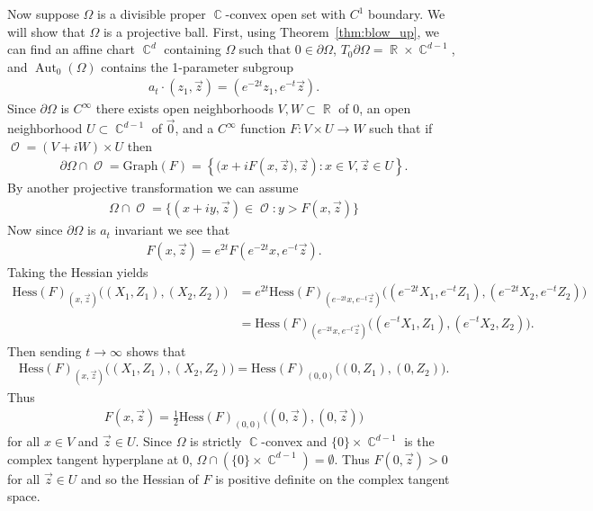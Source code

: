 \documentclass[12pt]{amsart}
\theoremstyle{plain}
\theoremstyle{definition}
\theoremstyle{remark}
\begin{document}
Now suppose $\Omega$ is a divisible proper $\operatorname{\mathbb{C}}$-convex open set with $C^1$ boundary. We will show that $\Omega$ is a projective ball. First, using Theorem~\ref{thm:blow_up}, we can find an affine chart $\operatorname{\mathbb{C}}^d$ containing $\Omega$ such that  $0 \in \partial \Omega$, $T_0 \partial \Omega = \operatorname{\mathbb{R}} \times \operatorname{\mathbb{C}}^{d-1}$, and $\operatorname{Aut}_0(\Omega)$ contains the 1-parameter subgroup
\begin{align*}
a_t \cdot (z_1, \vec{z}) = ( e^{-2t} z_1, e^{-t} \vec{z}).
\end{align*}
Since $\partial \Omega$ is $C^\infty$ there exists open neighborhoods $V,W \subset \operatorname{\mathbb{R}}$ of $0$, an open neighborhood $U \subset \operatorname{\mathbb{C}}^{d-1}$ of $\vec{0}$, and a $C^\infty$ function $F:V \times U \rightarrow W$ such that if $\operatorname{\mathcal{O}} = (V+iW) \times U$ then 
\begin{align*}
\partial \Omega \cap \operatorname{\mathcal{O}} = \mathrm{Graph}(F)=\left\{ (x+iF\left(x,\vec{z}), \vec{z}\right) : x \in V, \vec{z} \in U\right\}. 
\end{align*}
By another projective transformation we can assume 
\begin{align*}
\Omega \cap \operatorname{\mathcal{O}} = \{ (x+iy, \vec{z}) \in \operatorname{\mathcal{O}} : y > F(x,\vec{z}) \}
\end{align*}
Now since $\partial \Omega$ is $a_t$ invariant we see that
\begin{align*}
F(x,\vec{z}) = e^{2t} F(e^{-2t} x, e^{-t}\vec{z}).
\end{align*}
Taking the Hessian yields
\begin{align*}
\mathrm{Hess}(F)_{(x,\vec{z})} \Big( (X_1,Z_1), (X_2,Z_2) \Big) 
&= e^{2t} \mathrm{Hess}(F)_{(e^{-2t}x,e^{-t}\vec{z})} \Big( (e^{-2t}X_1, e^{-t}Z_1) , (e^{-2t}X_2, e^{-t}Z_2) \Big)\\
&=\mathrm{Hess}(F)_{(e^{-2t}x,e^{-t}\vec{z})} \Big( (e^{-t}X_1, Z_1) , (e^{-t}X_2, Z_2) \Big).
\end{align*}
Then sending $t \rightarrow \infty$ shows that
\begin{align*}
\mathrm{Hess}(F)_{(x,\vec{z})}  \Big( (X_1,Z_1), (X_2,Z_2) \Big)  = \mathrm{Hess}(F)_{(0,0)}  \Big( (0,Z_1), (0,Z_2) \Big).
\end{align*}
Thus 
\begin{align*}
F(x,\vec{z}) = \frac{1}{2} \mathrm{Hess}(F)_{(0,0)}  \Big( (0,\vec{z}), (0,\vec{z}) \Big)
\end{align*}
for all $x \in V$ and $\vec{z} \in U$. Since $\Omega$ is strictly $\operatorname{\mathbb{C}}$-convex and $\{0\} \times \operatorname{\mathbb{C}}^{d-1}$ is the complex tangent hyperplane at $0$, $\Omega \cap\left( \{0\} \times \operatorname{\mathbb{C}}^{d-1} \right)= \emptyset$. Thus $F(0,\vec{z}) >0$ for all $\vec{z} \in U$ and so the Hessian of $F$ is positive definite on the complex tangent space. 
\end{document}
